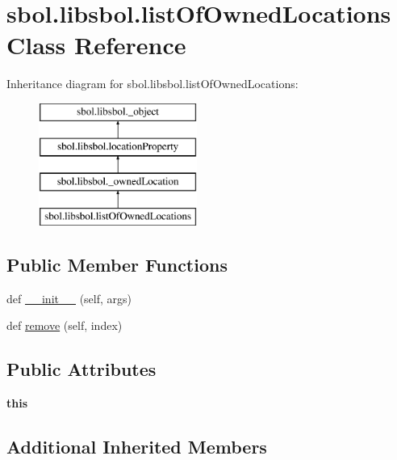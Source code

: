 \hypertarget{classsbol_1_1libsbol_1_1list_of_owned_locations}{}\section{sbol.\+libsbol.\+list\+Of\+Owned\+Locations Class Reference}
\label{classsbol_1_1libsbol_1_1list_of_owned_locations}
Inheritance diagram for sbol.\+libsbol.\+list\+Of\+Owned\+Locations\+:\begin{figure}[H]
\begin{center}
\leavevmode
\includegraphics[height=4.000000cm]{classsbol_1_1libsbol_1_1list_of_owned_locations}
\end{center}
\end{figure}
\subsection*{Public Member Functions}
\begin{DoxyCompactItemize}
\item 
def \hyperlink{classsbol_1_1libsbol_1_1list_of_owned_locations_a7991669445a8ce973bf3716407f21499}{\+\_\+\+\_\+init\+\_\+\+\_\+} (self, args)
\item 
def \hyperlink{classsbol_1_1libsbol_1_1list_of_owned_locations_a8785265da5a3d3f5cdfaeddd6e9ddd92}{remove} (self, index)
\end{DoxyCompactItemize}
\subsection*{Public Attributes}
\begin{DoxyCompactItemize}
\item 
{\bfseries this}\hypertarget{classsbol_1_1libsbol_1_1list_of_owned_locations_a68d26a4fbafaea330d41e9d3a0f9ba1b}{}\label{classsbol_1_1libsbol_1_1list_of_owned_locations_a68d26a4fbafaea330d41e9d3a0f9ba1b}

\end{DoxyCompactItemize}
\subsection*{Additional Inherited Members}


